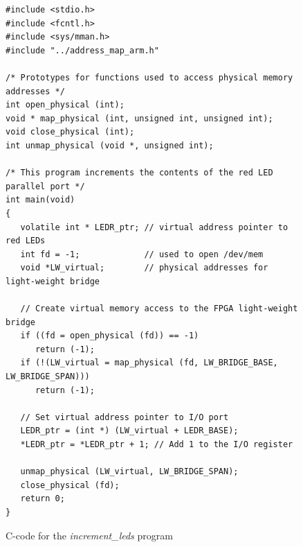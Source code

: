 \documentclass[11pt, twoside, pdftex]{article}
\begin{document}
\vspace{-0.25in}
\lstset{language=C,numbers=left}
\begin{figure}[H]
\begin{center}
\begin{minipage}[t]{16 cm}
\begin{lstlisting}
#include <stdio.h>
#include <fcntl.h>
#include <sys/mman.h>
#include "../address_map_arm.h"

/* Prototypes for functions used to access physical memory addresses */
int open_physical (int);
void * map_physical (int, unsigned int, unsigned int);
void close_physical (int);
int unmap_physical (void *, unsigned int);

/* This program increments the contents of the red LED parallel port */
int main(void)
{
   volatile int * LEDR_ptr; // virtual address pointer to red LEDs
   int fd = -1;             // used to open /dev/mem
   void *LW_virtual;        // physical addresses for light-weight bridge
    
   // Create virtual memory access to the FPGA light-weight bridge
   if ((fd = open_physical (fd)) == -1)
      return (-1);
   if (!(LW_virtual = map_physical (fd, LW_BRIDGE_BASE, LW_BRIDGE_SPAN)))
      return (-1);

   // Set virtual address pointer to I/O port
   LEDR_ptr = (int *) (LW_virtual + LEDR_BASE);
   *LEDR_ptr = *LEDR_ptr + 1; // Add 1 to the I/O register
    
   unmap_physical (LW_virtual, LW_BRIDGE_SPAN);
   close_physical (fd);
   return 0;
}
\end{lstlisting}
\end{minipage}
\end{center}
\vspace{-0.33in}\caption{C-code for the {\it increment\_leds} program}
\label{fig:increment_leds_code}
\end{figure}
\end{document}
